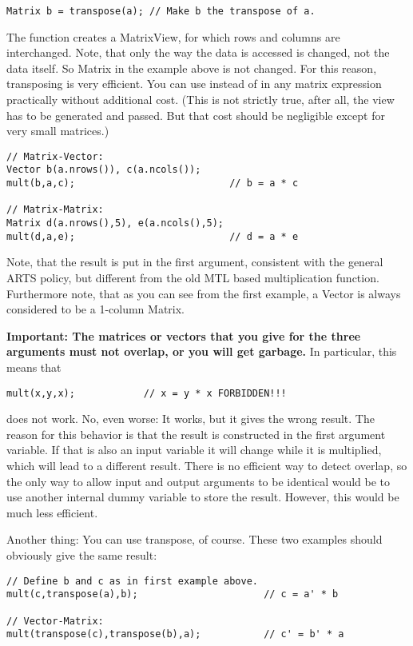 \begin{verbatim}
Matrix b = transpose(a); // Make b the transpose of a.
\end{verbatim}

The function  creates a MatrixView, for which rows and
columns are interchanged. Note, that only the way the data is accessed
is changed, not the data itself. So Matrix  in the example
above is not changed. For this reason, transposing is very efficient.
You can use  instead of  in any matrix
expression practically without additional cost. (This is not strictly
true, after all, the view has to be generated and passed. But that
cost should be negligible except for very small matrices.)

\begin{verbatim}
// Matrix-Vector:
Vector b(a.nrows()), c(a.ncols());
mult(b,a,c);                           // b = a * c

// Matrix-Matrix:
Matrix d(a.nrows(),5), e(a.ncols(),5);
mult(d,a,e);                           // d = a * e
\end{verbatim}

Note, that the result is put in the first argument, consistent with
the general ARTS policy, but different from the old MTL based
multiplication function. Furthermore note, that as you can see from
the first example, a Vector is always considered to be a 1-column
Matrix. 

\textbf{Important: The matrices or vectors that you give for the three
arguments must not overlap, or you will get garbage.} In particular,
this means that 
\begin{verbatim}
mult(x,y,x);            // x = y * x FORBIDDEN!!!
\end{verbatim}
does not work. No, even worse: It works, but it gives the wrong
result.  The reason for this behavior is that the result is
constructed in the first argument variable. If that is also an input
variable it will change while it is multiplied, which will lead to a
different result.  There is no efficient way to detect overlap, so the
only way to allow input and output arguments to be identical would be
to use another internal dummy variable to store the result. However,
this would be much less efficient.

Another thing: You can use transpose, of course. These two examples
should obviously give the same result:

\begin{verbatim}
// Define b and c as in first example above.
mult(c,transpose(a),b);                      // c = a' * b

// Vector-Matrix:
mult(transpose(c),transpose(b),a);           // c' = b' * a
\end{verbatim}


